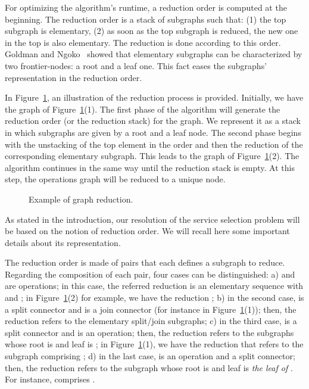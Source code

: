 \documentclass[a4paper]{article}
\begin{document}
For optimizing the algorithm's runtime, a reduction order is computed at the beginning. The reduction order is a stack of 
subgraphs such that: (1) the top subgraph is elementary, (2) as soon as the top subgraph is reduced, 
the new one in the  top is also elementary. The reduction is done 
according to this order. Goldman and Ngoko~\cite{GoldmanNgoko} showed that elementary subgraphs 
can be characterized by two frontier-nodes: a root and a leaf one. This fact eases the 
subgraphs' representation  in the reduction order. 

In Figure~\ref{Reduction-w-order}, an illustration of the reduction process is provided. 
Initially, we have the graph of Figure~\ref{Reduction-w-order}(1). The first phase of the 
algorithm will generate the reduction order (or the reduction stack) for the graph. We 
represent it as a stack in which subgraphs are given by a root and a leaf node. The second phase begins with 
the unstacking of the top element in the order and then the 
reduction of the corresponding elementary subgraph. This leads to the graph of 
Figure~\ref{Reduction-w-order}(2). The algorithm continues in the same way until 
the reduction stack is empty. At this step, the operations graph will be reduced to a unique node. 
\begin{figure}[htbp]
\centering
{}
\caption{Example of graph reduction.}\label{Reduction-w-order}
\end{figure}


As stated in the 
introduction, our resolution of the service selection problem will be based on the notion of reduction order.
We will recall here some important details about its representation. 

The reduction order is made of pairs  that each defines a subgraph to reduce. Regarding the composition of 
each pair, four cases can be distinguished: a)  and  are operations;  
in this case, the referred reduction is an elementary sequence with  and ; in Figure~\ref{Reduction-w-order}(2) 
for example, we have the reduction ; b) in the second case,  
is a split connector and  is a join connector (for instance   in Figure~\ref{Reduction-w-order}(1));  
then, the reduction refers to the elementary split/join subgraphs; c) in the third case,  is a split connector 
and  is an operation; then, the reduction 
refers to the subgraphs whose root is  and leaf is ; in Figure~\ref{Reduction-w-order}(1), we have the reduction  that
refers to the subgraph comprising ; d) in the last case,  is an operation and 
 a split connector; then, the reduction refers to the subgraph whose root is  and leaf is {\it the leaf of }. 
For instance,  comprises .
\end{document}

